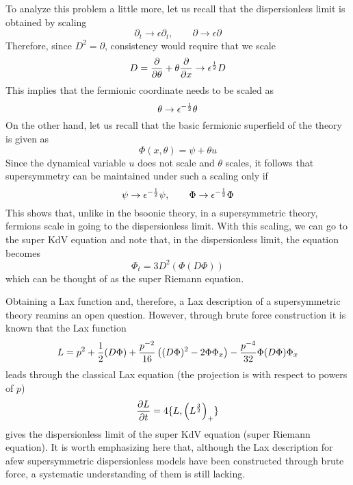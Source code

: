 \documentclass[a4paper,11pt]{article}
\begin{document}
To analyze this problem a little more, let us recall that the
dispersionless limit is obtained by scaling
$$
\partial_{t}\rightarrow \epsilon \partial_{t},\qquad \partial
\rightarrow \epsilon \partial
$$
Therefore, since $D^{2} = \partial$, consistency would require that we
scale
\begin{equation}
D = {\partial\over \partial \theta} + \theta {\partial\over \partial
x}  \rightarrow \epsilon^{1\over 2} D
\end{equation}
This implies that the fermionic coordinate needs to be scaled as
\begin{equation}
\theta \rightarrow \epsilon^{-{1\over 2}} \theta
\end{equation}
On the other hand, let us recall that the basic fermionic superfield
of the theory is given as
\begin{equation}
\Phi (x,\theta) = \psi + \theta u
\end{equation}
Since the dynamical variable $u$ does not scale and $\theta$ scales,
it follows that supersymmetry can be maintained under such a scaling
only if
\begin{equation}
\psi \rightarrow \epsilon^{-{1\over 2}} \psi, \qquad \Phi\rightarrow
\epsilon^{-{1\over 2}} \Phi
\end{equation}
This shows that, unlike in the bsoonic theory, in a supersymmetric
theory, fermions scale in going to the dispersionless limit. With this
scaling, we can go to the super KdV equation and note that, in the
dispersionless limit, the equation becomes
\begin{equation}
\Phi_{t} = 3 D^{2} \left(\Phi (D\Phi)\right)
\end{equation}
which can be thought of as the super Riemann equation.

Obtaining a Lax function and, therefore, a Lax description of a
supersymmetric theory reamins an open question. However, through brute
force construction it is known that the Lax function
\begin{equation}
L = p^{2} + {1\over 2} (D\Phi) + {p^{-2}\over 16} \left((D\Phi)^{2} -
2\Phi \Phi_{x}\right) - {p^{-4}\over 32} \Phi (D\Phi) \Phi_{x}
\end{equation}
leads through the classical Lax equation (the projection is with
respect to powers of $p$)
\begin{equation}
{\partial L\over \partial t} = 4 \{L , \left(L^{3\over 2}\right)_{+}\}
\end{equation}
gives the dispersionless limit of the super KdV equation (super
Riemann equation). It is worth emphasizing here that, although the Lax
description for afew supersymmetric dispersionless models have been
constructed through brute force, a systematic understanding of them is
still lacking.
\end{document}

